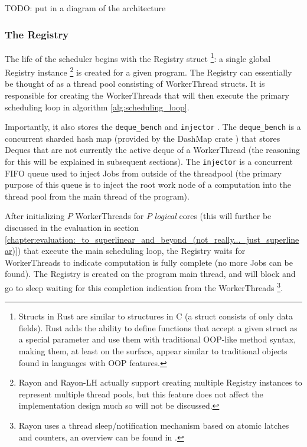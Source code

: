 \documentclass[bsc,frontabs,singlespacing,parskip,deptreport,normalheadings]{infthesis}
\begin{document}
TODO: put in a diagram of the architecture

\subsubsection*{The Registry}

The life of the scheduler begins with the Registry struct \footnote{Structs in
    Rust are similar to structures in C (a struct consists of only data fields).
    Rust adds the ability to define functions that accept a given struct as a
    special parameter and use them with traditional OOP-like method syntax,
    making them, at least on the surface, appear similar to traditional objects
    found in languages with OOP features.}: a single global Registry instance
    \footnote{Rayon and Rayon-LH actually support creating multiple Registry
    instances to represent multiple thread pools, but this feature does not
affect the implementation design much so will not be discussed.} is created for
a given program. The Registry can essentially be thought of as a thread pool
consisting of WorkerThread structs. It is responsible for creating the
WorkerThreads that will then execute the primary scheduling loop in algorithm
\ref{alg:scheduling_loop}.

Importantly, it also stores the \texttt{deque\_bench}
and \texttt{injector} . The \texttt{deque\_bench} is a concurrent sharded hash
map (provided by the DashMap crate \cite{joel_dashmap_2022}) that stores Deques
that are not currently the active deque of a WorkerThread (the reasoning for
this will be explained in subsequent sections). The \texttt{injector} is a
concurrent FIFO queue used to inject Jobs from outside of the threadpool (the
primary purpose of this queue is to inject the root work node of a computation
into the thread pool from the main thread of the program).

After initializing \(P\) WorkerThreads for \(P\) \textit{logical} cores (this
will further be discussed in the evaluation in section
\ref{chapter:evaluation:_to_superlinear_and_beyond_(not_really..._just_superlinear)})
that execute the main scheduling loop, the Registry waits for WorkerThreads to
indicate computation is fully complete (no more Jobs can be found). The Registry
is created on the program main thread, and will block and go to sleep waiting
for this completion indication from the WorkerThreads \footnote{Rayon uses a
thread sleep/notification mechanism based on atomic latches and counters, an
overview can be found in \cite{noauthor_rayon-sleep_2022}.}.
\end{document}
